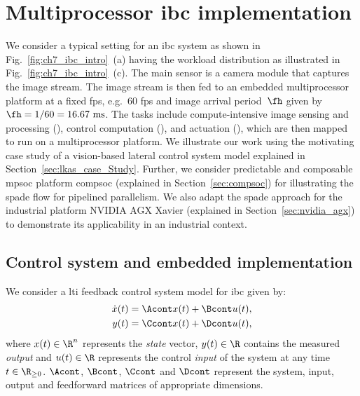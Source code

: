 \section{Multiprocessor \texorpdfstring{\gls{ibc}}{IBC} implementation}
\label{sec:ch7_embeddedIBC}
We consider a typical setting for an \gls{ibc} system as shown in Fig.~\ref{fig:ch7_ibc_intro}~(a) having the workload distribution as illustrated in Fig.~\ref{fig:ch7_ibc_intro}~(c). The main sensor is a camera module that captures the image stream. The image stream is then fed to an embedded multiprocessor platform at a fixed \gls{fps}, e.g.\ 60 fps and image arrival period~$\fh$ given by ${\fh=1/60=16.67\text{~ms}}$. 
The tasks include compute-intensive image sensing and processing (\taskS), control computation (\taskC), and actuation (\taskA), which are then mapped to run on a multiprocessor platform.
We illustrate our work using the motivating case study of a vision-based lateral control system model explained in Section~\ref{sec:lkas_case_Study}.
Further, we consider predictable and composable \gls{mpsoc} platform \gls{compsoc} (explained in Section~\ref{sec:compsoc}) for illustrating the \gls{spade} flow for pipelined parallelism. We also adapt the \gls{spade} approach for the industrial platform NVIDIA AGX Xavier (explained in Section~\ref{sec:nvidia_agx}) to demonstrate its applicability in an industrial context.

\subsection{Control system and embedded implementation}
We consider a \gls{lti} feedback control system model for \gls{ibc} given by:
\begin{align}
\label{eq:ch7_contsys}
\dot{x}(t) &= \Acont x(t) +  \Bcont u(t),\\
y(t) &= \Ccont x(t) + \Dcont u(t),\nonumber
\end{align}
where $x(t) \in \R^n$ represents the \textit{state} vector, $y(t)\in\R$ contains the measured \textit{output} and $u(t) \in \R$ represents the control \textit{input} of the system at any time $t \in \R_{\geq 0}$.
$\Acont$, $\Bcont$, $\Ccont$ and $\Dcont$ represent the system, input, output and feedforward matrices of appropriate dimensions. 

